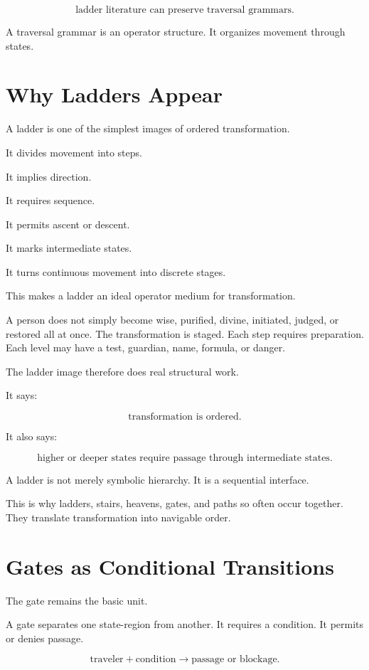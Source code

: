\documentclass[11pt]{book}
\begin{document}
\[
\text{ladder literature can preserve traversal grammars}.
\]

A traversal grammar is an operator structure. It organizes movement through states.

\section{Why Ladders Appear}

A ladder is one of the simplest images of ordered transformation.

It divides movement into steps.

It implies direction.

It requires sequence.

It permits ascent or descent.

It marks intermediate states.

It turns continuous movement into discrete stages.

This makes a ladder an ideal operator medium for transformation.

A person does not simply become wise, purified, divine, initiated, judged, or restored all at once. The transformation is staged. Each step requires preparation. Each level may have a test, guardian, name, formula, or danger.

The ladder image therefore does real structural work.

It says:

\[
\text{transformation is ordered}.
\]

It also says:

\[
\text{higher or deeper states require passage through intermediate states}.
\]

A ladder is not merely symbolic hierarchy. It is a sequential interface.

This is why ladders, stairs, heavens, gates, and paths so often occur together. They translate transformation into navigable order.

\section{Gates as Conditional Transitions}

The gate remains the basic unit.

A gate separates one state-region from another. It requires a condition. It permits or denies passage.

\[
\text{traveler} + \text{condition} \rightarrow \text{passage or blockage}.
\]
\end{document}
